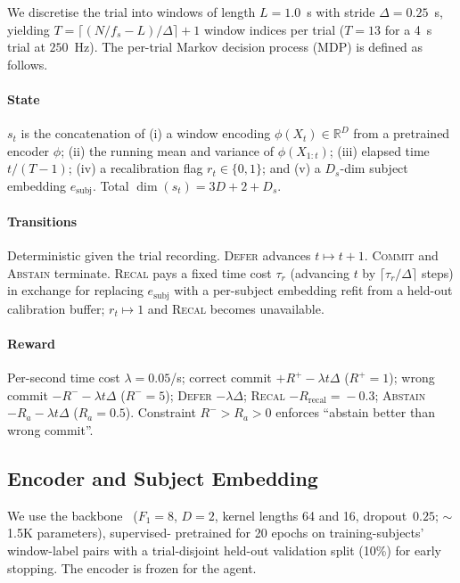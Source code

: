 We discretise the trial into windows of length $L = 1.0$~s with stride
$\Delta = 0.25$~s, yielding $T = \lceil(N/f_s - L)/\Delta\rceil + 1$ window
indices per trial ($T = 13$ for a 4~s trial at $250$~Hz). The per-trial
Markov decision process (MDP) is defined as follows.

\paragraph*{State}
$s_t$ is the concatenation of (i) a window encoding $\phi(X_t) \in
\mathbb{R}^{D}$ from a pretrained encoder $\phi$; (ii) the running mean
and variance of $\phi(X_{1{:}t})$; (iii) elapsed time $t/(T-1)$;
(iv) a recalibration flag $r_t \in \{0,1\}$; and (v) a $D_s$-dim subject
embedding $e_{\text{subj}}$. Total $\dim(s_t) = 3D + 2 + D_s$.

\paragraph*{Transitions}
Deterministic given the trial recording. \textsc{Defer} advances
$t \mapsto t+1$. \textsc{Commit} and \textsc{Abstain} terminate.
\textsc{Recal} pays a fixed time cost $\tau_r$ (advancing $t$ by
$\lceil \tau_r / \Delta \rceil$ steps) in exchange for replacing
$e_{\text{subj}}$ with a per-subject embedding refit from a held-out
calibration buffer; $r_t \mapsto 1$ and \textsc{Recal} becomes
unavailable.

\paragraph*{Reward}
Per-second time cost $\lambda\!=\!0.05$/s; correct commit
$+R^+\!-\!\lambda t\Delta$ ($R^+\!=\!1$); wrong commit
$-R^-\!-\!\lambda t\Delta$ ($R^-\!=\!5$); \textsc{Defer}
$-\lambda\Delta$; \textsc{Recal} $-R_{\text{recal}}\!=\!-0.3$;
\textsc{Abstain} $-R_a\!-\!\lambda t\Delta$ ($R_a\!=\!0.5$).
Constraint $R^->R_a>0$ enforces ``abstain better than wrong commit''.

\subsection{Encoder and Subject Embedding}\label{sec:methods:encoder}

We use the \eegnet{} backbone~\cite{Lawhern2018} ($F_1=8$, $D=2$, kernel
lengths 64 and 16, dropout~$0.25$; $\sim$1.5K parameters), supervised-
pretrained for 20 epochs on training-subjects' window-label pairs with a
trial-disjoint held-out validation split (10\%) for early stopping. The
encoder is frozen for the agent.

